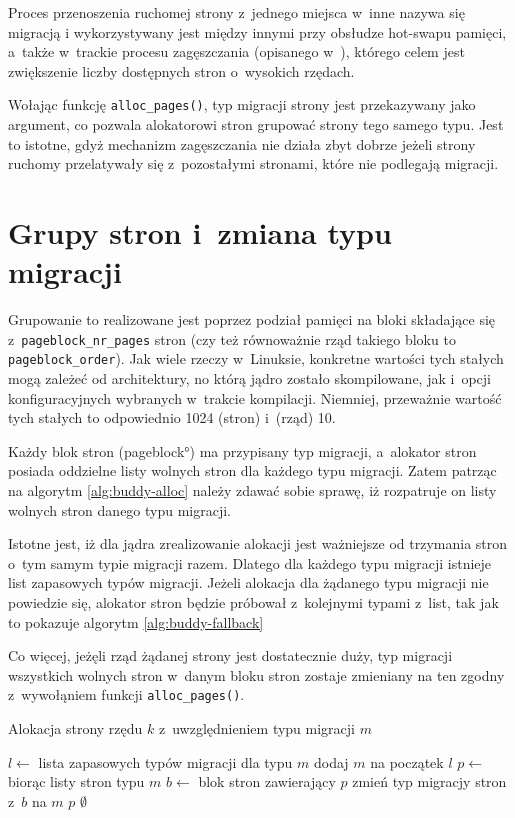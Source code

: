 Proces przenoszenia ruchomej strony z~jednego miejsca w~inne nazywa
się migracją i wykorzystywany jest między innymi przy obsłudze
hot-swapu pamięci, a~także w~trackie procesu zagęszczania (opisanego
w~\cite{bib:compaction}), którego celem jest zwiększenie liczby
dostępnych stron o~wysokich rzędach.

Wołając funkcję \lstinline|alloc_pages()|, typ migracji strony jest
przekazywany jako argument, co pozwala alokatorowi stron grupować
strony tego samego typu.  Jest to istotne, gdyż mechanizm zagęszczania
nie działa zbyt dobrze jeżeli strony ruchomy przelatywały się
z~pozostałymi stronami, które nie podlegają migracji.

\section{Grupy stron i~zmiana typu migracji}

Grupowanie to realizowane jest poprzez podział pamięci na bloki
składające się z~\lstinline|pageblock_nr_pages| stron (czy też
równoważnie rząd takiego bloku to \lstinline|pageblock_order|).  Jak
wiele rzeczy w~Linuksie, konkretne wartości tych stałych mogą zależeć
od architektury, no którą jądro zostało skompilowane, jak i~opcji
konfiguracyjnych wybranych w~trakcie kompilacji.  Niemniej, przeważnie
wartość tych stałych to odpowiednio 1024 (stron) i~(rząd) 10.

Każdy blok stron (\ang{pageblock}) ma przypisany typ migracji,
a~alokator stron posiada oddzielne listy wolnych stron dla każdego
typu migracji.  Zatem patrząc na algorytm \ref{alg:buddy-alloc} należy
zdawać sobie sprawę, iż rozpatruje on listy wolnych stron danego typu
migracji.

Istotne jest, iż dla jądra zrealizowanie alokacji jest ważniejsze od
trzymania stron o~tym samym typie migracji razem.  Dlatego dla każdego
typu migracji istnieje list zapasowych typów migracji.  Jeżeli
alokacja dla żądanego typu migracji nie powiedzie się, alokator stron
będzie próbował z~kolejnymi typami z~list, tak jak to pokazuje
algorytm \ref{alg:buddy-fallback}

Co więcej, jeżęli rząd żądanej strony jest dostatecznie duży, typ
migracji wszystkich wolnych stron w~danym bloku stron zostaje
zmieniany na ten zgodny z~wywołąniem funkcji
\lstinline|alloc_pages()|.

\begin{algorithm}
\caption{Alokacja strony rzędu $k$ z~uwzględnieniem typu migracji $m$}
\label{alg:buddy-fallback}
\begin{algorithmic}[1]
    \State $l \gets$ lista zapasowych typów migracji dla typu $m$
    \State dodaj $m$ na początek $l$
        \State $p \gets$  biorąc listy stron typu $m$
                \State $b \gets$ blok stron zawierający $p$
                \State zmień typ migracjy stron z~$b$ na $m$
            \EndIf
            \State \Return $p$
        \EndIf
    \EndFor
    \State \Return $\emptyset$
\EndFunction
\end{algorithmic}
\end{algorithm}

